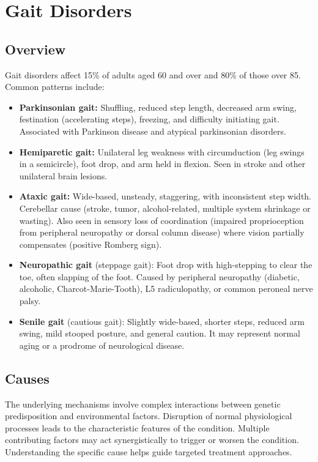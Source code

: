 \chapter{Gait Disorders}
\label{sec:Gait Disorders}

\section{Overview}
Gait disorders affect 15\% of adults aged 60 and over and 80\% of those over 85. Common patterns include:

\begin{itemize}[noitemsep]
  \item \textbf{Parkinsonian gait:} Shuffling, reduced step length, decreased arm swing, festination (accelerating steps), freezing, and difficulty initiating gait. Associated with Parkinson disease and atypical parkinsonian disorders.
  \item \textbf{Hemiparetic gait:} Unilateral leg weakness with circumduction (leg swings in a semicircle), foot drop, and arm held in flexion. Seen in stroke and other unilateral brain lesions.
  \item \textbf{Ataxic gait:} Wide-based, unsteady, staggering, with inconsistent step width. Cerebellar cause (stroke, tumor, alcohol-related, multiple system shrinkage or wasting). Also seen in sensory loss of coordination (impaired proprioception from peripheral neuropathy or dorsal column disease) where vision partially compensates (positive Romberg sign).
  \item \textbf{Neuropathic gait} (steppage gait): Foot drop with high-stepping to clear the toe, often slapping of the foot. Caused by peripheral neuropathy (diabetic, alcoholic, Charcot-Marie-Tooth), L5 radiculopathy, or common peroneal nerve palsy.
  \item \textbf{Senile gait} (cautious gait): Slightly wide-based, shorter steps, reduced arm swing, mild stooped posture, and general caution. It may represent normal aging or a prodrome of neurological disease.
\end{itemize}
\section{Causes}
The underlying mechanisms involve complex interactions between genetic predisposition and environmental factors. Disruption of normal physiological processes leads to the characteristic features of the condition. Multiple contributing factors may act synergistically to trigger or worsen the condition. Understanding the specific cause helps guide targeted treatment approaches.
